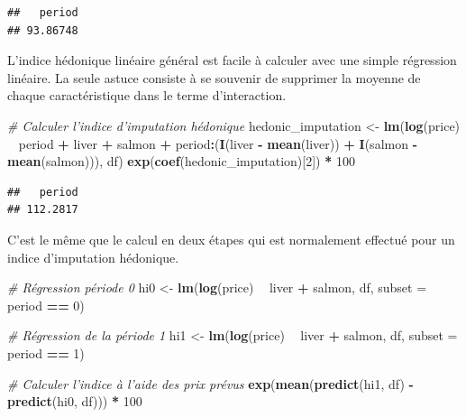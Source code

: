 \documentclass[]{article}
\newenvironment{Shaded}{\begin{snugshade}}{\end{snugshade}}
\newcommand{\CommentTok}[1]{\textcolor[rgb]{0.56,0.35,0.01}{\textit{#1}}}
\newcommand{\DataTypeTok}[1]{\textcolor[rgb]{0.13,0.29,0.53}{#1}}
\newcommand{\DecValTok}[1]{\textcolor[rgb]{0.00,0.00,0.81}{#1}}
\newcommand{\KeywordTok}[1]{\textcolor[rgb]{0.13,0.29,0.53}{\textbf{#1}}}
\newcommand{\NormalTok}[1]{#1}
\newcommand{\OperatorTok}[1]{\textcolor[rgb]{0.81,0.36,0.00}{\textbf{#1}}}
\newcommand{\StringTok}[1]{\textcolor[rgb]{0.31,0.60,0.02}{#1}}
\begin{document}
\begin{verbatim}
##   period 
## 93.86748
\end{verbatim}

L'indice hédonique linéaire général est facile à calculer avec une simple régression linéaire. La seule astuce consiste à se souvenir de supprimer la moyenne de chaque caractéristique dans le terme d'interaction.

\begin{Shaded}
\begin{Highlighting}[]
\CommentTok{# Calculer l'indice d'imputation hédonique}
\NormalTok{hedonic_imputation <-}\StringTok{ }\KeywordTok{lm}\NormalTok{(}\KeywordTok{log}\NormalTok{(price) }\OperatorTok{~}\StringTok{ }\NormalTok{period }\OperatorTok{+}\StringTok{ }\NormalTok{liver }\OperatorTok{+}\StringTok{ }\NormalTok{salmon }\OperatorTok{+}\StringTok{ }
\StringTok{                           }\NormalTok{period}\OperatorTok{:}\NormalTok{(}\KeywordTok{I}\NormalTok{(liver }\OperatorTok{-}\StringTok{ }\KeywordTok{mean}\NormalTok{(liver)) }\OperatorTok{+}\StringTok{ }\KeywordTok{I}\NormalTok{(salmon }\OperatorTok{-}\StringTok{ }\KeywordTok{mean}\NormalTok{(salmon))), }
\NormalTok{                         df)}
\KeywordTok{exp}\NormalTok{(}\KeywordTok{coef}\NormalTok{(hedonic_imputation)[}\DecValTok{2}\NormalTok{]) }\OperatorTok{*}\StringTok{ }\DecValTok{100}
\end{Highlighting}
\end{Shaded}

\begin{verbatim}
##   period 
## 112.2817
\end{verbatim}

C'est le même que le calcul en deux étapes qui est normalement effectué pour un indice d'imputation hédonique.

\begin{Shaded}
\begin{Highlighting}[]
\CommentTok{# Régression période 0}
\NormalTok{hi0 <-}\StringTok{ }\KeywordTok{lm}\NormalTok{(}\KeywordTok{log}\NormalTok{(price) }\OperatorTok{~}\StringTok{ }\NormalTok{liver }\OperatorTok{+}\StringTok{ }\NormalTok{salmon, df, }\DataTypeTok{subset =}\NormalTok{ period }\OperatorTok{==}\StringTok{ }\DecValTok{0}\NormalTok{)}

\CommentTok{# Régression de la période 1}
\NormalTok{hi1 <-}\StringTok{ }\KeywordTok{lm}\NormalTok{(}\KeywordTok{log}\NormalTok{(price) }\OperatorTok{~}\StringTok{ }\NormalTok{liver }\OperatorTok{+}\StringTok{ }\NormalTok{salmon, df, }\DataTypeTok{subset =}\NormalTok{ period }\OperatorTok{==}\StringTok{ }\DecValTok{1}\NormalTok{)}

\CommentTok{# Calculer l'indice à l'aide des prix prévus}
\KeywordTok{exp}\NormalTok{(}\KeywordTok{mean}\NormalTok{(}\KeywordTok{predict}\NormalTok{(hi1, df) }\OperatorTok{-}\StringTok{ }\KeywordTok{predict}\NormalTok{(hi0, df))) }\OperatorTok{*}\StringTok{ }\DecValTok{100}
\end{Highlighting}
\end{Shaded}
\end{document}
